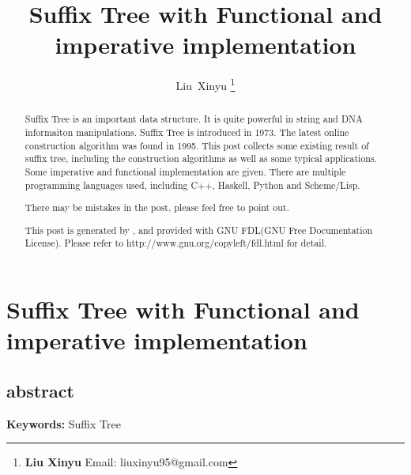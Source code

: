 \documentclass{article}
\begin{document}
\fi


\title{Suffix Tree with Functional and imperative implementation}

\author{Liu~Xinyu
\thanks{{\bfseries Liu Xinyu } \newline
  Email: liuxinyu95@gmail.com \newline}
  }


\maketitle

\ifx\wholebook\relax
\chapter{Suffix Tree with Functional and imperative implementation}

\section{abstract}
\else
\begin{abstract}
\fi
Suffix Tree is an important data structure. It is quite powerful in 
string and DNA informaiton manipulations. Suffix Tree is introduced in 1973.
The latest online construction algorithm was found in 1995. This post 
collects some existing result of suffix tree, including the construction
algorithms as well as some typical applications. Some imperative and functional
implementation are given. There are multiple programming languages used, 
including C++, Haskell, Python and Scheme/Lisp.

There may be mistakes in the post, please feel free to point out.

This post is generated by \LaTeXe, and provided with GNU FDL(GNU Free Documentation License).
Please refer to http://www.gnu.org/copyleft/fdl.html for detail.

\ifx\wholebook\relax \else
\end{abstract}
\fi

\vspace{3cm}
{\bfseries Keywords:} Suffix Tree
\end{document}
